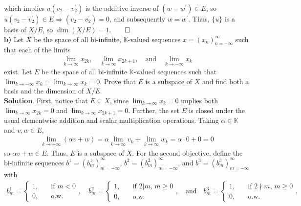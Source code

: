 \documentclass[10pt]{article}
\newcommand{\mbb}[1]{\mathbb{#1}}
\newcommand{\1}[1]{\mathbbm{1}_{#1}}
\begin{document}
    which implies $u(v_2-v_2^\prime)$ is the additive inverse of $(w-w^\prime)\in E$, so $u(v_2-v_2^\prime)\in E\Rightarrow (v_2-v_2^\prime)=0$, and subsequently $w=w^\prime$. Thus, $\{u\}$ is a basis of $X/E$, so $\dim(X/E)=1$.\hfill{$\qed$}\\[5pt]
    {\bf b)} Let $X$ be the space of all bi-infinite, $\mbb{K}$-valued sequences $x=(x_n)_{n=-\infty}^{\infty}$ such that each of the limits
    \begin{align*}
        \lim_{k\rightarrow\infty}x_{2k},\quad\lim_{k\rightarrow\infty}x_{2k+1},\quad\text{and}\quad\lim_{k\rightarrow-\infty}x_k
    \end{align*}
    exist. Let $E$ be the space of all bi-infinite $\mbb{K}$-valued sequences such that $\lim_{k\rightarrow-\infty}x_k=\lim_{k\rightarrow\infty}x_k=0$. Prove that $E$ is a subspace of $X$
    and find both a basis and the dimension of $X/E$.\\[5pt]
    {\bf Solution}. First, notice that $E\subseteq X$, since $\lim_{k\rightarrow\infty}x_k=0$ implies both $\lim_{k\rightarrow\infty}x_{2k}=0$ and $\lim_{k\rightarrow\infty}x_{2k+1}=0$. Further, the set $E$ is closed under the usual
    elementwise addition and scalar multiplication operations. Taking $\alpha\in\mbb{K}$ and $v,w\in E$,
    \begin{align*}
        \lim_{k\rightarrow\pm\infty}(\alpha v+w)=\alpha\lim_{k\rightarrow\infty}v_k+\lim_{k\rightarrow\infty}w_k=\alpha\cdot0+0=0
    \end{align*}
    so $\alpha v+w\in E$. Thus, $E$ is a subspace of $X$. For the second objective, define the bi-infinite sequences $b^1=(b^1_m)_{m=-\infty}^\infty$, $b^2=(b^2_m)_{m=-\infty}^\infty$, and $b^3=(b^3_m)_{m=-\infty}^\infty$ with
    \begin{align*}
        b^1_m=\begin{cases}
            1,\quad&\text{if $m<0$}\\
            0,\quad&\text{o.w.}
        \end{cases},\quad
        b^2_m=\begin{cases}
            1,\quad&\text{if $2|m$, $m\geq 0$}\\
            0,\quad&\text{o.w.}
        \end{cases},\quad\text{and}\quad
        b^3_m=\begin{cases}
            1,\quad&\text{if $2\nmid m$, $m\geq 0$}\\
            0,\quad&\text{o.w.}
        \end{cases}.
    \end{align*}
\end{document}
